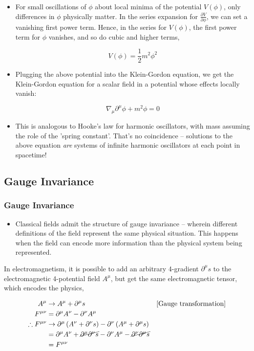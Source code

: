 \documentclass{beamer}
\begin{document}
\begin{frame}
\begin{itemize}
\item For small oscillations of $\phi$ about local minima of the potential $V \left( \phi \right)$, only differences in $\phi$ physically matter. In the series expansion for $\frac{\partial V}{\partial \phi}$, we can set a vanishing first power term. Hence, in the series for $V \left( \phi \right)$, the first power term for $\phi$ vanishes, and so do cubic and higher terms,

$$V \left( \phi \right) = \frac{1}{2} m^2 \phi^2$$

\item Plugging the above potential into the Klein-Gordon equation, we get the Klein-Gordon equation for a scalar field in a potential whose effects locally vanish:

$$\boxed{\nabla_\mu \partial^\mu \phi + m^2 \phi = 0}$$

\item This is analogous to Hooke's law for harmonic oscillators, with mass assuming the role of the 'spring constant'. That's no coincidence -- solutions to the above equation \emph{are} systems of infinite harmonic oscillators at each point in spacetime!
\end{itemize}
\end{frame}

\subsection{Gauge Invariance}
\begin{frame}
\frametitle{Gauge Invariance}

\begin{itemize}
\item Classical fields admit the structure of gauge invariance -- wherein different definitions of the field represent the same physical situation. This happens when the field can encode more information than the physical system being represented.
\end{itemize}

\begin{example}
In electromagnetism, it is possible to add an arbitrary 4-gradient $\partial^\mu s$ to the electromagnetic 4-potential field $A^\mu$, but get the same electromagnetic tensor, which encodes the physics,

\begin{align*}
A^\mu & \to A^\mu + \partial^\mu s & \left[ \text{Gauge transformation} \right] \\
F^{\mu \nu} & = \partial^\mu A^\nu - \partial^\nu A^\mu \\
\therefore F^{\mu \nu} & \to \partial^\mu \left( A^\nu + \partial^\nu s \right) - \partial^\nu \left( A^\mu + \partial^\mu s \right) \\
& = \partial^\mu A^\nu + \cancel{\partial^\mu \partial^\nu s} - \partial^\nu A^\mu - \cancel{\partial^\nu \partial^\mu s} \\
& = F^{\mu \nu}
\end{align*}
\end{example}
\end{frame}
\end{document}
